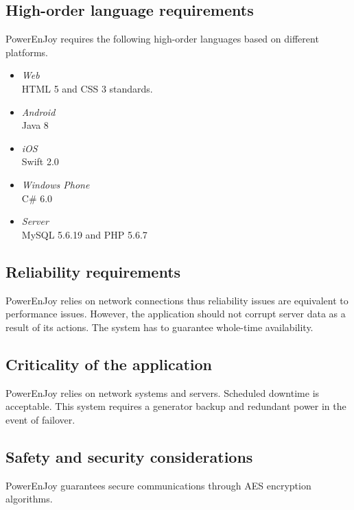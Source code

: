 \subsection{High-order language requirements}
PowerEnJoy requires the following high-order languages based on different platforms.
\begin{itemize}
	\item\textit{Web}\\
	HTML 5 and CSS 3 standards.
	\item\textit{Android}\\
	Java 8
	\item\textit{iOS}\\
	Swift 2.0
	\item\textit{Windows Phone}\\
	C\# 6.0
	\item \textit{Server}\\
	MySQL 5.6.19 and PHP 5.6.7
\end{itemize}


\subsection{Reliability requirements}
PowerEnJoy relies on network connections thus reliability issues are equivalent to performance issues.  However, the application should not corrupt server data as a result of its actions. The system has to guarantee whole-time availability.

\subsection{Criticality of the application}
 PowerEnJoy relies on network systems and servers. Scheduled downtime is acceptable. This system requires a generator backup and redundant power in the event of failover.

\subsection{Safety and security considerations}
PowerEnJoy guarantees secure communications through AES encryption algorithms.